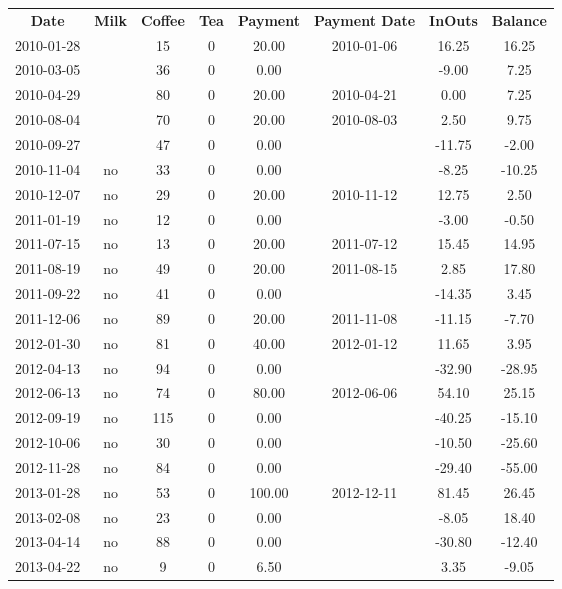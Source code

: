 \begin{center}
\begin{tabular}{cccccccc}
\textbf{Date} & \textbf{Milk} & \textbf{Coffee} & \textbf{Tea} & \textbf{Payment} & \textbf{Payment Date} & \textbf{InOuts} & \textbf{Balance} \\
2010-01-28 &  &  15 & 0 &  20.00 & 2010-01-06 &  16.25 &  16.25\\ 
2010-03-05 &  &  36 & 0 &   0.00 &  &  -9.00 &   7.25\\ 
2010-04-29 &  &  80 & 0 &  20.00 & 2010-04-21 &   0.00 &   7.25\\ 
2010-08-04 &  &  70 & 0 &  20.00 & 2010-08-03 &   2.50 &   9.75\\ 
2010-09-27 &  &  47 & 0 &   0.00 &  & -11.75 &  -2.00\\ 
2010-11-04 & no &  33 & 0 &   0.00 &  &  -8.25 & -10.25\\ 
2010-12-07 & no &  29 & 0 &  20.00 & 2010-11-12 &  12.75 &   2.50\\ 
2011-01-19 & no &  12 & 0 &   0.00 &  &  -3.00 &  -0.50\\ 
2011-07-15 & no &  13 & 0 &  20.00 & 2011-07-12 &  15.45 &  14.95\\ 
2011-08-19 & no &  49 & 0 &  20.00 & 2011-08-15 &   2.85 &  17.80\\ 
2011-09-22 & no &  41 & 0 &   0.00 &  & -14.35 &   3.45\\ 
2011-12-06 & no &  89 & 0 &  20.00 & 2011-11-08 & -11.15 &  -7.70\\ 
2012-01-30 & no &  81 & 0 &  40.00 & 2012-01-12 &  11.65 &   3.95\\ 
2012-04-13 & no &  94 & 0 &   0.00 &  & -32.90 & -28.95\\ 
2012-06-13 & no &  74 & 0 &  80.00 & 2012-06-06 &  54.10 &  25.15\\ 
2012-09-19 & no & 115 & 0 &   0.00 &  & -40.25 & -15.10\\ 
2012-10-06 & no &  30 & 0 &   0.00 &  & -10.50 & -25.60\\ 
2012-11-28 & no &  84 & 0 &   0.00 &  & -29.40 & -55.00\\ 
2013-01-28 & no &  53 & 0 & 100.00 & 2012-12-11 &  81.45 &  26.45\\ 
2013-02-08 & no &  23 & 0 &   0.00 &  &  -8.05 &  18.40\\ 
2013-04-14 & no &  88 & 0 &   0.00 &  & -30.80 & -12.40\\ 
2013-04-22 & no &   9 & 0 &   6.50 &  &   3.35 &  -9.05
\end{tabular}
\end{center}

